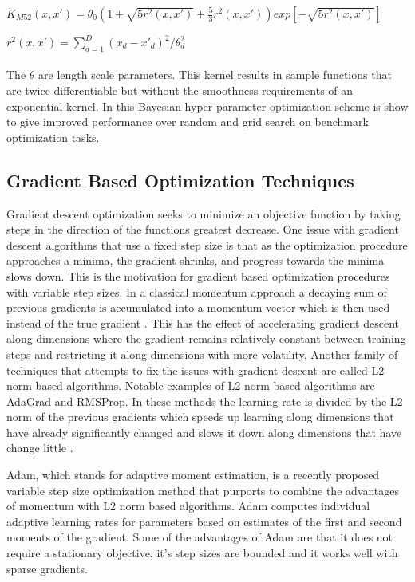 \documentclass[12pt,letterpaper]{article}
\begin{document}
$K_{M52}(x,x') = \theta_0(1 + \sqrt{5r^2(x,x')} + \frac{5}{3}r^2(x,x'))exp[-\sqrt{5r^2(x,x')}]$

$r^2(x,x') = \sum_{d=1}^{D}(x_d - x'_d)^2/\theta_d^2$
\\
\\
The $\theta$ are length scale parameters.  This kernel results in sample functions that are twice differentiable but without the smoothness requirements of an exponential kernel.  In \cite{Snoek:2012:PBO:2999325.2999464} this Bayesian hyper-parameter optimization scheme is show to give improved performance over random and grid search on benchmark optimization tasks.

\subsection{Gradient Based Optimization Techniques}

Gradient descent optimization seeks to minimize an objective function by taking steps in the direction of the functions greatest decrease.  One issue with gradient descent algorithms that use a fixed step size is that as the optimization procedure approaches a minima, the gradient shrinks, and progress towards the minima slows down.  This is the motivation for gradient based optimization procedures with variable step sizes.  In a classical momentum approach a decaying sum of previous gradients is accumulated into a momentum vector which is then used instead of the true gradient \cite{icml2013_sutskever13}.  This has the effect of accelerating gradient descent along dimensions where the gradient remains relatively constant between training steps and restricting it along dimensions with more volatility.  Another family of techniques that attempts to fix the issues with gradient descent are called L2 norm based algorithms.  Notable examples of L2 norm based algorithms are AdaGrad and RMSProp.  In these methods the learning rate is divided by the L2 norm of the previous gradients which speeds up learning along dimensions that have already significantly changed and slows it down along dimensions that have change little \cite{Duchi:2011:ASM:1953048.2021068}.  

Adam, which stands for adaptive moment estimation, is a recently proposed variable step size optimization method \cite{journals/corr/KingmaB14} that purports to combine the advantages of momentum with L2 norm based algorithms. Adam computes individual adaptive learning rates for parameters based on estimates of the first and second moments of the gradient.  Some of the advantages of Adam are that it does not require a stationary objective, it's step sizes are bounded and it works well with sparse gradients.  
\end{document}
